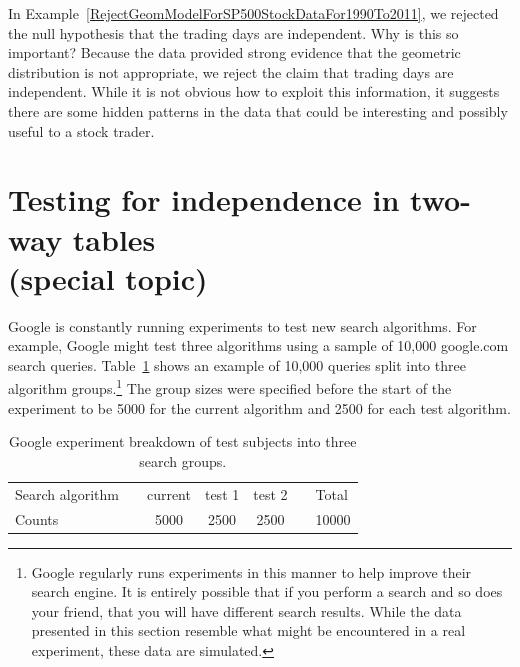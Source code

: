 \begin{example}{In Example~\ref{RejectGeomModelForSP500StockDataFor1990To2011}, we rejected the null hypothesis that the trading days are independent. Why is this so important?}
Because the data provided strong evidence that the geometric distribution is not appropriate, we reject the claim that trading days are independent. While it is not obvious how to exploit this information, it suggests there are some hidden patterns in the data that could be interesting and possibly useful to a stock trader.
\end{example}




\section[Testing for independence in two-way tables (sp. topic)]{Testing for independence in two-way tables\\(special topic) ~}
\label{twoWayTablesAndChiSquare}


Google is constantly running experiments to test new search algorithms. For example, Google might test three algorithms using a sample of 10,000 google.com search queries. Table~\ref{googleSearchAlgorithmByAlgorithmOnly} shows an example of 10,000 queries split into three algorithm groups.\footnote{Google regularly runs experiments in this manner to help improve their search engine. It is entirely possible that if you perform a search and so does your friend, that you will have different search results. While the data presented in this section resemble what might be encountered in a real experiment, these data are simulated.} The group sizes were specified before the start of the experiment to be 5000 for the current algorithm and 2500 for each test algorithm.

\begin{table}[h]
\centering
\begin{tabular}{ll ccc ll}
\hline
Search algorithm	 & \hspace{1mm} & current & test 1 & test 2 & \hspace{1mm} & Total \\
Counts &		& 5000 & 2500 & 2500 & & 10000 \\
\hline
\end{tabular}
\caption{Google experiment breakdown of test subjects into three search groups.}
\label{googleSearchAlgorithmByAlgorithmOnly}
\end{table}

